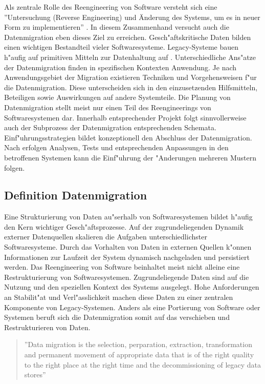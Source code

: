 Als zentrale Rolle des Reengineering von Software versteht sich eine ''Untersuchung (Reverse Engineering) und Änderung des Systems, um es in neuer Form zu implementieren'' \citep{chikofsky-1990}. In diesem Zusammenhand versucht auch die Datenmigration eben dieses Ziel zu erreichen. Gesch"aftskritische Daten bilden einen wichtigen Bestandteil vieler Softwaresysteme. Legacy-Systeme bauen h"aufig auf primitiven Mitteln zur Datenhaltung auf \citep{henrard-2002}.
\lb 
Unterschiedliche Ans"atze der Datenmigration finden in spezifischen Kontexten Anwendung. Je nach Anwendungsgebiet der Migration existieren Techniken und Vorgehensweisen f"ur die Datenmigration. Diese unterscheiden sich in den einzusetzenden Hilfsmitteln, Beteiligen sowie Auswirkungen auf andere Systemteile.
\lb
Die Planung von Datenmigration stellt meist nur einen Teil des Reengineerings von Softwaresystemen dar. Innerhalb entsprechender Projekt folgt sinnvollerweise auch der Subprozess der Datenmigration entsprechenden Schemata.
\lb
Einf"uhrungsstrategien bildet konzeptionell den Abschluss der Datenmigration. Nach erfolgen Analysen, Tests und entsprechenden Anpassungen in den betroffenen Systemen kann die Einf"uhrung der "Anderungen mehreren Mustern folgen.
\lb

\subsection{Definition Datenmigration}

Eine Strukturierung von Daten au"serhalb von Softwaresystemen bildet h"aufig den Kern wichtiger Gesch"aftsprozesse. Auf der zugrundeliegenden Dynamik externer Datenquellen skalieren die Aufgaben unterschiedlichster Softwaresysteme. Durch das Vorhalten von Daten in externen Quellen k"onnen Informationen zur Laufzeit der System dynamisch nachgeladen und persistiert werden.
\lb
Das Reengineering von Software beinhaltet meist nicht alleine eine Restrukturierung von Softwaresystemen. Zugrundeliegende Daten sind auf die Nutzung und den speziellen Kontext des Systems ausgelegt. Hohe Anforderungen an Stabilit"at und Verl"asslichkeit machen diese Daten zu einer zentralen Komponente von Legacy-Systemen.
\lb
Anders als eine Portierung von Software oder Systemen beruft sich die Datenmigration somit auf das verschieben und Restrukturieren von Daten.

\begin{quote}''Data migration is the selection, perparation, extraction, transformation and permanent movement of appropriate data that is of the right quality to the right place at the right time and the decommissioning of legacy data stores'' \flushright\citep[S.~7]{morris-2012}
\end{quote}

